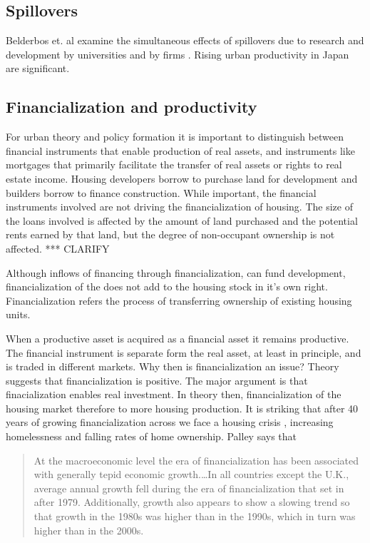 \subsection{Spillovers}
Belderbos et. al examine the simultaneous effects of spillovers due to research and development by universities and by firms \cite{belderbosWhatSpilloversUniversities2022}. Rising urban productivity in Japan are significant. 




\subsection{Financialization and productivity}

For urban theory and policy formation it is important to distinguish between financial instruments that enable production of real assets, and instruments like  mortgages that primarily facilitate the transfer of real assets or rights to real estate income. Housing developers borrow to purchase land for development and builders borrow to finance construction. While important, the financial instruments involved are not driving the financialization of housing.  The size of the loans involved is affected by the amount of land purchased and the potential rents earned by that land, but the degree of non-occupant ownership is not affected. *** CLARIFY

Although inflows of financing through financialization, can fund development, financialization of the does not add to the housing stock in it's own right. Financialization refers the process of transferring ownership of existing housing units. 

When  a productive asset is acquired as a financial asset it remains productive.  The financial instrument is separate form the real asset, at least in principle, and is traded in different markets. Why then is financialization an issue?  Theory suggests that financialization is positive.  The major argument is that finacialization enables real investment. In theory then, financialization of the housing market therefore  to more housing production. It is striking that after 40 years of growing financialization across we face a housing crisis , increasing homelessness and falling rates of home ownership.  Palley \cite{palleyFinancializationWhatIt2007} says that 

\begin{quotation}At the macroeconomic level the era of financialization has been associated with generally tepid economic growth.\dots  In all countries except the U.K., average annual growth fell during the era of financialization that set in after 1979. Additionally, growth also appears to show a slowing trend so that growth in the 1980s was higher than in the 1990s, which in turn was higher than in the 2000s. \end{quotation}

